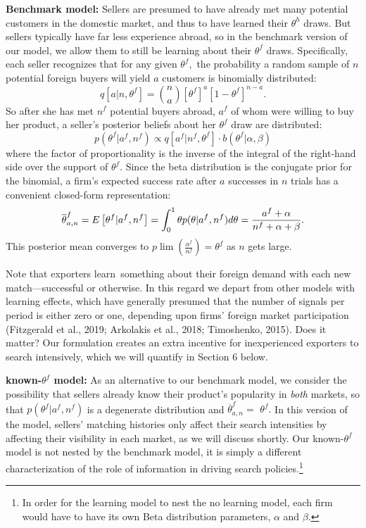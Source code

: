 \documentclass[12pt]{article}
\begin{document}
\textbf{Benchmark model:} Sellers are presumed to have already met many
potential customers in the domestic market, and thus to have learned their $%
\theta ^{h}$ draws. But sellers typically have far less experience abroad,
so in the benchmark version of our model, we allow them to still be learning
about their $\theta ^{f}$ draws. Specifically, each seller recognizes that
for any given $\theta ^{f},$ the probability a random sample of $n$
potential foreign buyers will yield $a$ customers is binomially distributed: 
\begin{equation*}
q\left[ a|n,\theta ^{f}\right] =\binom{n}{a}\left[ \theta ^{f}\right] ^{a}%
\left[ 1-\theta ^{f}\right] ^{n-a}.
\end{equation*}%
So after she has met $n^{f}$ potential buyers abroad, $a^{f}$ of whom were
willing to buy her product, a seller's posterior beliefs about her $\theta
^{f}$ draw are distributed:%
\begin{equation*}
p(\theta ^{f}|a^{f},n^{f})\propto q\left[ a^{f}|n^{f},\theta ^{f}\right]
\cdot b(\theta ^{f}|\alpha ,\beta )
\end{equation*}%
where the factor of proportionality is the inverse of the integral of the
right-hand side over the support of $\theta ^{f}$. Since the beta
distribution is the conjugate prior for the binomial, a firm's expected
success rate after $a$ successes in $n$ trials has a convenient closed-form
representation: 
\begin{equation}
\overline{\theta }_{a,n}^{f}=E\left[ \theta ^{f}|a^{f},n^{f}\right]
=\int_{0}^{1}\theta p(\theta |a^{f},n^{f})d\theta =\frac{a^{f}+\alpha }{%
n^{f}+\alpha +\beta }.  \label{success_probability}
\end{equation}%
This posterior mean converges to $p\lim \left( \frac{a^{f}}{n^{f}}\right)
=\theta ^{f}$ as $n$ gets large.

Note that exporters learn\ something about their foreign demand with each
new match---successful or otherwise. In this regard we depart from other
models with learning effects, which have generally presumed that the number
of signals per period is either zero or one, depending upon firms' foreign
market participation (Fitzgerald et al., 2019; Arkolakis et al., 2018;
Timoshenko, 2015). Does it matter? Our formulation creates an extra
incentive for inexperienced exporters to search intensively, which we will
quantify in Section 6 below.

\textbf{known-$\theta ^{f}$ model: }As an alternative to our benchmark
model, we consider the possibility that sellers already know their product's
popularity in \textit{both} markets, so that $p(\theta ^{f}|a^{f},n^{f})$ is
a degenerate distribution and $\overline{\theta }_{a,n}^{f}=$ $\theta ^{f}.$
In this version of the model, sellers' matching histories only affect their
search intensities by affecting their visibility in each market, as we will
discuss shortly. Our known-$\theta ^{f}$ model is not nested by the
benchmark model, it is simply a different characterization of the role of
information in driving search policies.\footnote{%
In order for the learning model to nest the no learning model, each firm
would have to have its own Beta distribution parameters, $\alpha $ and $%
\beta .$}
\end{document}

